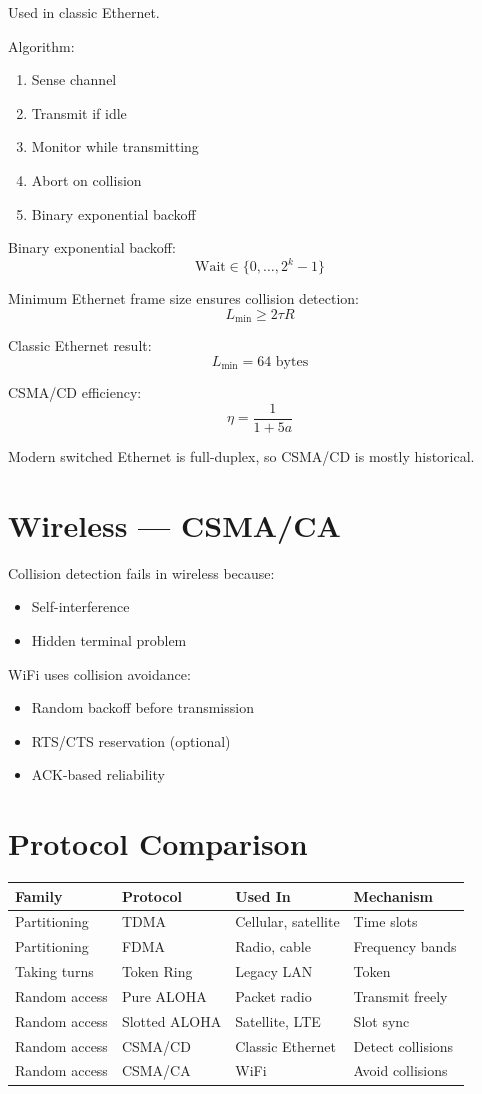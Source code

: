\documentclass[11pt]{article}
\begin{document}
Used in classic Ethernet.

Algorithm:
\begin{enumerate}
\item Sense channel
\item Transmit if idle
\item Monitor while transmitting
\item Abort on collision
\item Binary exponential backoff
\end{enumerate}

Binary exponential backoff:
\[
\text{Wait} \in \{0, \ldots, 2^{k}-1\}
\]

Minimum Ethernet frame size ensures collision detection:
\[
L_{\min} \ge 2 \tau R
\]

Classic Ethernet result:
\[
L_{\min} = 64 \text{ bytes}
\]

CSMA/CD efficiency:
\[
\eta = \frac{1}{1 + 5a}
\]

Modern switched Ethernet is full-duplex, so CSMA/CD is mostly historical.

\section{Wireless — CSMA/CA}

Collision detection fails in wireless because:
\begin{itemize}
\item Self-interference
\item Hidden terminal problem
\end{itemize}

WiFi uses collision avoidance:
\begin{itemize}
\item Random backoff before transmission
\item RTS/CTS reservation (optional)
\item ACK-based reliability
\end{itemize}

\section{Protocol Comparison}

\begin{center}
\begin{tabular}{llll}
\toprule
Family & Protocol & Used In & Mechanism \\
\midrule
Partitioning & TDMA & Cellular, satellite & Time slots \\
Partitioning & FDMA & Radio, cable & Frequency bands \\
Taking turns & Token Ring & Legacy LAN & Token \\
Random access & Pure ALOHA & Packet radio & Transmit freely \\
Random access & Slotted ALOHA & Satellite, LTE & Slot sync \\
Random access & CSMA/CD & Classic Ethernet & Detect collisions \\
Random access & CSMA/CA & WiFi & Avoid collisions \\
\bottomrule
\end{tabular}
\end{center}
\end{document}

